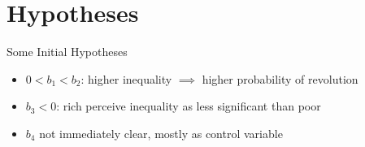 \documentclass[mathserif]{beamer}
\begin{document}
	\section{Hypotheses}
	\begin{frame}{Some Initial Hypotheses}
		\begin{itemize}[<+->]
			\item $0<b_1<b_2$: higher inequality $\implies$ higher probability of revolution
			\item $b_3<0$: rich perceive inequality as less significant than poor
			\item $b_4$ not immediately clear, mostly as control variable
		\end{itemize}
	\end{frame}
\end{document}
